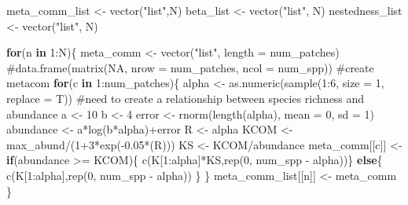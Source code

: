 \documentclass[
  letterpaper,
  DIV=11,
  numbers=noendperiod]{scrartcl}
\newenvironment{Shaded}{\begin{snugshade}}{\end{snugshade}}
\newcommand{\AttributeTok}[1]{\textcolor[rgb]{0.40,0.45,0.13}{#1}}
\newcommand{\CommentTok}[1]{\textcolor[rgb]{0.37,0.37,0.37}{#1}}
\newcommand{\ControlFlowTok}[1]{\textcolor[rgb]{0.00,0.23,0.31}{\textbf{#1}}}
\newcommand{\DecValTok}[1]{\textcolor[rgb]{0.68,0.00,0.00}{#1}}
\newcommand{\FloatTok}[1]{\textcolor[rgb]{0.68,0.00,0.00}{#1}}
\newcommand{\FunctionTok}[1]{\textcolor[rgb]{0.28,0.35,0.67}{#1}}
\newcommand{\NormalTok}[1]{\textcolor[rgb]{0.00,0.23,0.31}{#1}}
\newcommand{\OtherTok}[1]{\textcolor[rgb]{0.00,0.23,0.31}{#1}}
\newcommand{\SpecialCharTok}[1]{\textcolor[rgb]{0.37,0.37,0.37}{#1}}
\newcommand{\StringTok}[1]{\textcolor[rgb]{0.13,0.47,0.30}{#1}}
\begin{document}
\begin{Shaded}
\begin{Highlighting}[]
\NormalTok{meta\_comm\_list }\OtherTok{\textless{}{-}} \FunctionTok{vector}\NormalTok{(}\StringTok{"list"}\NormalTok{,N)}
\NormalTok{beta\_list }\OtherTok{\textless{}{-}} \FunctionTok{vector}\NormalTok{(}\StringTok{"list"}\NormalTok{, N)}
\NormalTok{nestedness\_list }\OtherTok{\textless{}{-}} \FunctionTok{vector}\NormalTok{(}\StringTok{"list"}\NormalTok{, N)}

\ControlFlowTok{for}\NormalTok{(n }\ControlFlowTok{in} \DecValTok{1}\SpecialCharTok{:}\NormalTok{N)\{}
\NormalTok{  meta\_comm }\OtherTok{\textless{}{-}} \FunctionTok{vector}\NormalTok{(}\StringTok{"list"}\NormalTok{, }\AttributeTok{length =}\NormalTok{ num\_patches)}
                      \CommentTok{\#data.frame(matrix(NA, nrow = num\_patches, ncol = num\_spp)) \#create metacom}
  \ControlFlowTok{for}\NormalTok{(c }\ControlFlowTok{in} \DecValTok{1}\SpecialCharTok{:}\NormalTok{num\_patches)\{}
\NormalTok{    alpha }\OtherTok{\textless{}{-}} \FunctionTok{as.numeric}\NormalTok{(}\FunctionTok{sample}\NormalTok{(}\DecValTok{1}\SpecialCharTok{:}\DecValTok{6}\NormalTok{, }\AttributeTok{size =} \DecValTok{1}\NormalTok{, }\AttributeTok{replace =}\NormalTok{ T))}
    \CommentTok{\#need to create a relationship between species richness and abundance}
\NormalTok{    a }\OtherTok{\textless{}{-}} \DecValTok{10}
\NormalTok{    b }\OtherTok{\textless{}{-}} \DecValTok{4}
\NormalTok{    error }\OtherTok{\textless{}{-}} \FunctionTok{rnorm}\NormalTok{(}\FunctionTok{length}\NormalTok{(alpha), }\AttributeTok{mean =} \DecValTok{0}\NormalTok{, }\AttributeTok{sd =} \DecValTok{1}\NormalTok{)}
\NormalTok{    abundance }\OtherTok{\textless{}{-}}\NormalTok{ a}\SpecialCharTok{*}\FunctionTok{log}\NormalTok{(b}\SpecialCharTok{*}\NormalTok{alpha)}\SpecialCharTok{+}\NormalTok{error}
\NormalTok{    R }\OtherTok{\textless{}{-}}\NormalTok{ alpha}
\NormalTok{    KCOM }\OtherTok{\textless{}{-}}\NormalTok{ max\_abund}\SpecialCharTok{/}\NormalTok{(}\DecValTok{1}\SpecialCharTok{+}\DecValTok{3}\SpecialCharTok{*}\FunctionTok{exp}\NormalTok{(}\SpecialCharTok{{-}}\FloatTok{0.05}\SpecialCharTok{*}\NormalTok{(R)))}
\NormalTok{    KS }\OtherTok{\textless{}{-}}\NormalTok{ KCOM}\SpecialCharTok{/}\NormalTok{abundance}
\NormalTok{    meta\_comm[[c]] }\OtherTok{\textless{}{-}} \ControlFlowTok{if}\NormalTok{(abundance }\SpecialCharTok{\textgreater{}=}\NormalTok{ KCOM)\{}
      \FunctionTok{c}\NormalTok{(K[}\DecValTok{1}\SpecialCharTok{:}\NormalTok{alpha]}\SpecialCharTok{*}\NormalTok{KS,}\FunctionTok{rep}\NormalTok{(}\DecValTok{0}\NormalTok{, num\_spp }\SpecialCharTok{{-}}\NormalTok{ alpha))\} }\ControlFlowTok{else}\NormalTok{\{}
        \FunctionTok{c}\NormalTok{(K[}\DecValTok{1}\SpecialCharTok{:}\NormalTok{alpha],}\FunctionTok{rep}\NormalTok{(}\DecValTok{0}\NormalTok{, num\_spp }\SpecialCharTok{{-}}\NormalTok{ alpha))}
\NormalTok{      \}}
\NormalTok{  \}}
\NormalTok{  meta\_comm\_list[[n]] }\OtherTok{\textless{}{-}}\NormalTok{ meta\_comm}
\NormalTok{\}}
\end{Highlighting}
\end{Shaded}
\end{document}
